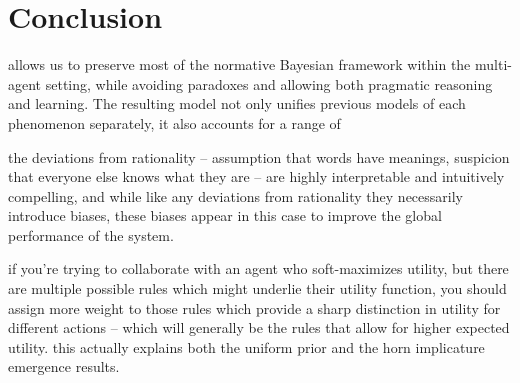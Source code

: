 \documentclass{article} %
\begin{document}
%




\section{Conclusion}

allows us to preserve most of the normative Bayesian framework within the multi-agent setting, while avoiding paradoxes and allowing both pragmatic reasoning and learning. The resulting model not only unifies previous models of each phenomenon separately, it also accounts for a range of 

the deviations from rationality -- assumption that words have meanings, suspicion that everyone else knows what they are -- are highly interpretable and intuitively compelling, and while like any deviations from rationality they necessarily introduce biases, these biases appear in this case to improve the global performance of the system. 

if you're trying to collaborate with an agent who soft-maximizes utility, but there are multiple possible rules which might underlie their utility function, you should assign more weight to those rules which provide a sharp distinction in utility for different actions -- which will generally be the rules that allow for higher expected utility. this actually explains both the uniform prior and the horn implicature emergence results.
\end{document}
